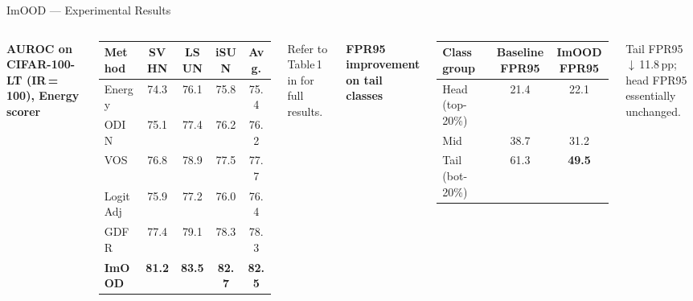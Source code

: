 \documentclass[aspectratio=169,10pt]{beamer}
\newcommand{\good}[1]{\cellcolor{good}#1}
\newcommand{\neu}[1]{\cellcolor{neutral}#1}
\begin{document}
\begin{frame}{ImOOD --- Experimental Results}
  \begin{columns}[T]
      \textbf{AUROC on CIFAR-100-LT (IR\,=\,100), Energy scorer}
      \vspace{4pt}
      \footnotesize
      \renewcommand{\arraystretch}{1.25}
      \begin{tabular}{lcccc}
        \toprule
        Method & SVHN & LSUN & iSUN & Avg. \\
        \midrule
        Energy    & 74.3 & 76.1 & 75.8 & 75.4 \\
        ODIN      & 75.1 & 77.4 & 76.2 & 76.2 \\
        VOS       & 76.8 & 78.9 & 77.5 & 77.7 \\
        LogitAdj  & 75.9 & 77.2 & 76.0 & 76.4 \\
        GDFR      & 77.4 & 79.1 & 78.3 & 78.3 \\
        \midrule
        \textbf{ImOOD} & \good{\textbf{81.2}} & \good{\textbf{83.5}}
                       & \good{\textbf{82.7}} & \good{\textbf{82.5}} \\
        \bottomrule
      \end{tabular}
      \normalsize
      \vspace{4pt}
      {\scriptsize Refer to Table\,1 in \cite{ImOOD2024} for full results.}
      \vspace{6pt}

      \textbf{FPR95 improvement on tail classes}
      \vspace{2pt}
      \footnotesize
      \begin{tabular}{lcc}
        \toprule
        Class group & Baseline FPR95 & ImOOD FPR95 \\
        \midrule
        Head (top-20\%) & 21.4 & \neu{22.1} \\
        Mid              & 38.7 & \good{31.2} \\
        Tail (bot-20\%) & 61.3 & \good{\textbf{49.5}} \\
        \bottomrule
      \end{tabular}
      \normalsize
      \vspace{2pt}
      {\scriptsize Tail FPR95 $\downarrow$\,11.8\,pp; head FPR95 essentially unchanged.}


\end{columns}
\end{frame}
\end{document}
